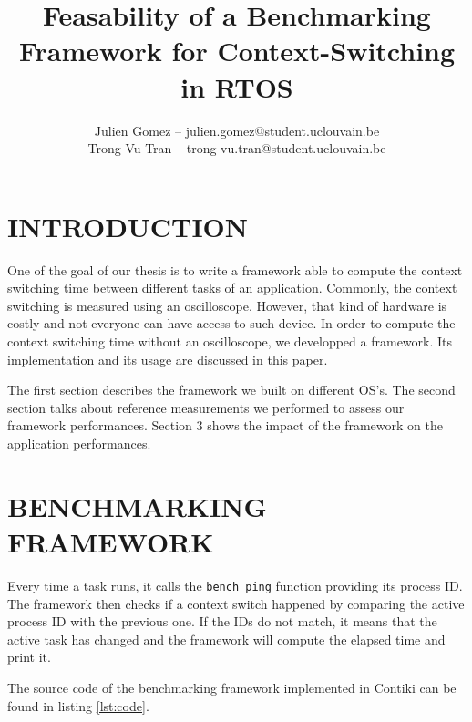\documentclass[a4paper, 10pt, conference]{ieeeconf}      %
\title{\LARGE \bf
Feasability of a Benchmarking Framework for Context-Switching in RTOS
}
\author{Julien Gomez -- julien.gomez@student.uclouvain.be
\\ Trong-Vu Tran -- trong-vu.tran@student.uclouvain.be}
\begin{document}
\maketitle
\thispagestyle{empty}
\pagestyle{empty}




\section{INTRODUCTION}
One of the goal of our thesis is to write a framework able to compute the context switching time between different tasks of an application.
Commonly, the context switching is measured using an oscilloscope.
However, that kind of hardware is costly and not everyone can have access to such device.
In order to compute the context switching time without an oscilloscope, we developped a framework.
Its implementation and its usage are discussed in this paper.

The first section describes the framework we built on different OS's.
The second section talks about reference measurements we performed to assess our framework performances.
Section 3 shows the impact of the framework on the application performances.


\section{\label{sec:bench}BENCHMARKING FRAMEWORK}

Every time a task runs, it calls the \texttt{bench\_ping} function providing its process ID.
The framework then checks if a context switch happened by comparing the active process ID with the previous one.
If the IDs do not match, it means that the active task has changed and the framework will compute the elapsed time and print it.

The source code of the benchmarking framework implemented in Contiki can be found in listing \ref{lst:code}.
\end{document}
